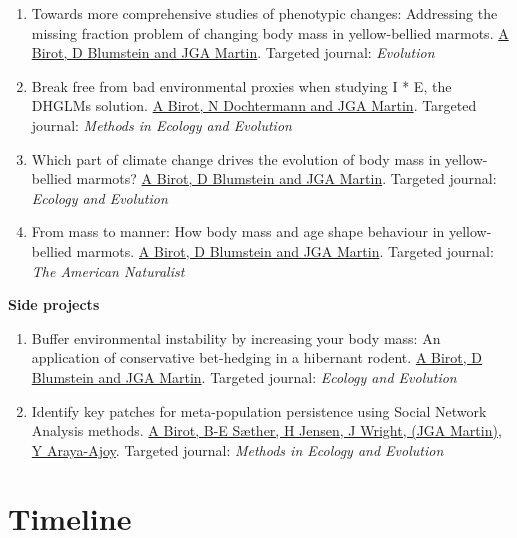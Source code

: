 \documentclass[
  12pt,
  letterpaper,
]{scrartcl}
\begin{document}
\begin{enumerate}
\def\labelenumi{\arabic{enumi}.}
\setcounter{enumi}{1}
\item
  Towards more comprehensive studies of phenotypic changes: Addressing
  the missing fraction problem of changing body mass in yellow-bellied
  marmots. \ul{A Birot, D Blumstein and JGA Martin}. Targeted journal:
  \emph{Evolution}
\item
  Break free from bad environmental proxies when studying I * E, the
  DHGLMs solution. \ul{A Birot, N Dochtermann and JGA Martin}. Targeted
  journal: \emph{Methods in Ecology and Evolution}
\item
  Which part of climate change drives the evolution of body mass in
  yellow-bellied marmots? \ul{A Birot, D Blumstein and JGA Martin}.
  Targeted journal: \emph{Ecology and Evolution}
\item
  From mass to manner: How body mass and age shape behaviour in
  yellow-bellied marmots. \ul{A Birot, D Blumstein and JGA Martin}.
  Targeted journal: \emph{The American Naturalist}
\end{enumerate}

\textbf{Side projects}

\begin{enumerate}
\def\labelenumi{\arabic{enumi}.}
\setcounter{enumi}{5}
\item
  Buffer environmental instability by increasing your body mass: An
  application of conservative bet-hedging in a hibernant rodent. \ul{A
  Birot, D Blumstein and JGA Martin}. Targeted journal: \emph{Ecology
  and Evolution}
\item
  Identify key patches for meta-population persistence using Social
  Network Analysis methods. \ul{A Birot, B-E Sæther, H Jensen, J Wright,
  (JGA Martin), Y Araya-Ajoy}. Targeted journal: \emph{Methods in
  Ecology and Evolution}
\end{enumerate}

\newpage{}

\section{Timeline}\label{timeline}
\end{document}
